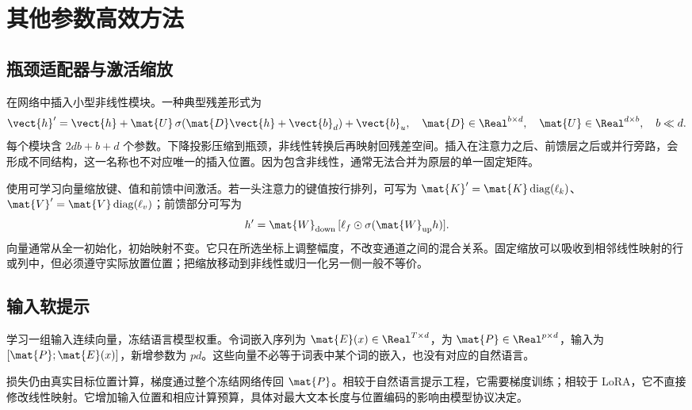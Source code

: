 \documentclass[../textbook.tex]{subfiles}
\begin{document}
\section{其他参数高效方法}
\optional
\subsection{瓶颈适配器与激活缩放}
在网络中插入小型非线性模块\cite{houlsby2019adapters}。一种典型残差形式为
\begin{equation}
\vect{h}'=\vect{h}+\mat{U}\,\sigma(\mat{D}\vect{h}+\vect{b}_d)+\vect{b}_u,
\quad \mat{D}\in\Real^{b\times d},\quad \mat{U}\in\Real^{d\times b},\quad b\ll d.
\end{equation}
每个模块含 $2db+b+d$ 个参数。下降投影压缩到瓶颈，非线性转换后再映射回残差空间。插入在注意力之后、前馈层之后或并行旁路，会形成不同结构，这一名称也不对应唯一的插入位置。因为包含非线性，通常无法合并为原层的单一固定矩阵。

使用可学习向量缩放键、值和前馈中间激活\cite{liu2022ia3}。若一头注意力的键值按行排列，可写为 $\mat{K}'=\mat{K}\operatorname{diag}(\ell_k)$、$\mat{V}'=\mat{V}\operatorname{diag}(\ell_v)$；前馈部分可写为
\begin{equation}
h'=\mat{W}_{\mathrm{down}}\,[\ell_f\odot\sigma(\mat{W}_{\mathrm{up}}h)].
\end{equation}
向量通常从全一初始化，初始映射不变。它只在所选坐标上调整幅度，不改变通道之间的混合关系。固定缩放可以吸收到相邻线性映射的行或列中，但必须遵守实际放置位置；把缩放移动到非线性或归一化另一侧一般不等价。

\subsection{输入软提示}
学习一组输入连续向量，冻结语言模型权重\cite{lester2021prompt}。令词嵌入序列为 $\mat{E}(x)\in\Real^{T\times d}$，为 $\mat{P}\in\Real^{p\times d}$，输入为 $[\mat{P};\mat{E}(x)]$，新增参数为 $pd$。这些向量不必等于词表中某个词的嵌入，也没有对应的自然语言。

损失仍由真实目标位置计算，梯度通过整个冻结网络传回 $\mat{P}$。相较于自然语言提示工程，它需要梯度训练；相较于 LoRA，它不直接修改线性映射。它增加输入位置和相应计算预算，具体对最大文本长度与位置编码的影响由模型协议决定。
\end{document}
